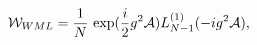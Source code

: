\begin{equation}
\label{wml}
{\cal W}_{WML}= {{1}\over {N}} \, \exp (\frac{i}{2}g^2 {\cal A}) L^{(1)}_{N-1}(-i g^2 {\cal A}),  
\end{equation}


